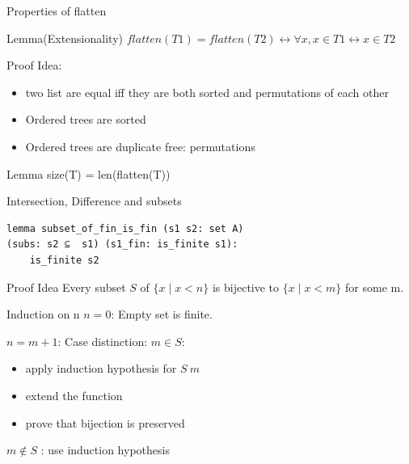 \documentclass[aspectratio=169]{beamer}
\begin{document}
\begin{frame}{Properties of flatten}
    \begin{block}{Lemma(Extensionality)}
        $flatten (T1) = flatten (T2) \leftrightarrow \forall x, x \in T1 \leftrightarrow x \in T2$
    \end{block}
    \begin{block}{Proof}
        Idea:
            \begin{itemize}
                \item two list are equal iff they are both sorted and permutations of each other
                \item Ordered trees are sorted
                \item Ordered trees are duplicate free: permutations
            \end{itemize}
    \end{block}
    \begin{block}{Lemma}
        size(T) = len(flatten(T))
    \end{block}
\end{frame}
\begin{frame}[fragile]{Intersection, Difference and subsets}
    \begin{lstlisting}[aboveskip=0pt, belowskip=0pt]
lemma subset_of_fin_is_fin (s1 s2: set A) 
(subs: s2 ⊆  s1) (s1_fin: is_finite s1):
    is_finite s2
    \end{lstlisting}\begin{block}{Proof Idea}
        Every subset $S$ of $\{x \mid x < n\}$ is bijective to $\{x \mid x < m\}$ for some m.
        
        Induction on n
        $n=0$: Empty set is finite.

        $n=m+1$: Case distinction: $m \in S$:
            \begin{itemize}
                \item apply induction hypothesis for $S \ {m}$
                \item extend the function
                \item prove that bijection is preserved
            \end{itemize}
            $m \not \in S$ : use induction hypothesis
    \end{block}

\end{frame}
\end{document}
